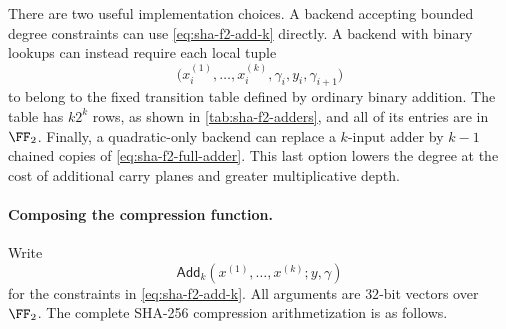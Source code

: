 There are two useful implementation choices.  A backend accepting bounded
degree constraints can use \eqref{eq:sha-f2-add-k} directly.  A backend with
binary lookups can instead require each local tuple
\[
 \bigl(x_i^{(1)},\ldots,x_i^{(k)},\gamma_i,y_i,\gamma_{i+1}\bigr)
\]
to belong to the fixed transition table defined by ordinary binary addition.
The table has $k2^k$ rows, as shown in \cref{tab:sha-f2-adders}, and all of
its entries are in $\FF_2$.  Finally, a quadratic-only backend can replace a
$k$-input adder by $k-1$ chained copies of
\eqref{eq:sha-f2-full-adder}.  This last option lowers the degree at the cost
of additional carry planes and greater multiplicative depth.

\paragraph{Composing the compression function.}
Write
\[
 \mathsf{Add}_k(x^{(1)},\ldots,x^{(k)};y,\gamma)
\]
for the constraints in \eqref{eq:sha-f2-add-k}.  All arguments are
$32$-bit vectors over $\FF_2$.  The complete SHA-256 compression
arithmetization is as follows.

